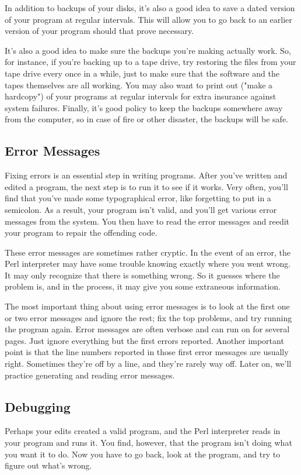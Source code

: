 In addition to backups of your disks, it's also a good idea to save a dated version of your program at regular intervals. This will allow you to go back to an earlier version of your program should that prove necessary.

It's also a good idea to make sure the backups you're making actually work. So, for instance, if you're backing up to a tape drive, try restoring the files from your tape drive every once in a while, just to make sure that the software and the tapes themselves are all working.  You may also want to print out ("make a hardcopy") of your programs at regular intervals for extra insurance against system failures. Finally, it's good policy to keep the backups somewhere away from the computer, so in case of fire or other disaster, the backups will be safe.

\subsection{Error Messages}
Fixing errors is an essential step in writing programs. After you've written and edited a program, the next step is to run it to see if it works. Very often, you'll find that you've made some typographical error, like forgetting to put in a semicolon. As a result, your program isn't valid, and you'll get various error messages from the system. You then have to read the error messages and reedit your program to repair the offending code.

These error messages are sometimes rather cryptic. In the event of an error, the Perl interpreter may have some trouble knowing exactly where you went wrong. It may only recognize that there is something wrong. So it guesses where the problem is, and in the process, it may give you some extraneous information.

The most important thing about using error messages is to look at the first one or two error messages and ignore the rest; fix the top problems, and try running the program again. Error messages are often verbose and can run on for several pages. Just ignore everything but the first errors reported. Another important point is that the line numbers reported in those first error messages are usually right. Sometimes they're off by a line, and they're rarely way off. Later on, we'll practice generating and reading error messages.

\subsection{Debugging}
Perhaps your edits created a valid program, and the Perl interpreter reads in your program and runs it. You find, however, that the program isn't doing what you want it to do. Now you have to go back, look at the program, and try to figure out what's wrong.

